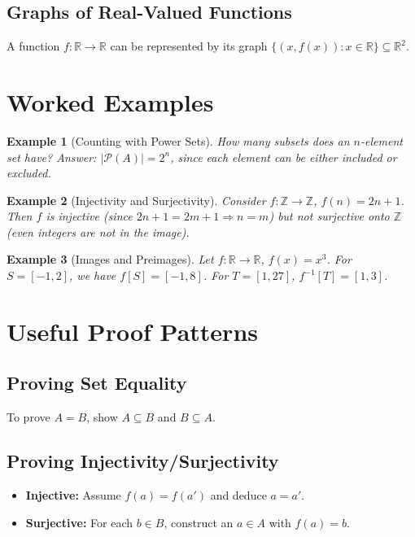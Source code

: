 \documentclass[11pt]{article}
\newtheorem{example}{Example}
\newcommand{\Z}{\mathbb{Z}}
\newcommand{\R}{\mathbb{R}}
\newcommand{\powerset}{\mathcal{P}}
\begin{document}
\subsection{Graphs of Real-Valued Functions}
A function $f\colon \R\to\R$ can be represented by its graph $\{(x,f(x)): x\in\R\}\subseteq\R^2$.

\begin{center}
\end{center}

\section{Worked Examples}
\begin{example}[Counting with Power Sets]
How many subsets does an $n$-element set have? \;\emph{Answer:} $|\powerset(A)|=2^n$, since each element can be either included or excluded.
\end{example}

\begin{example}[Injectivity and Surjectivity]
Consider $f\colon \Z\to\Z$, $f(n)=2n+1$. Then $f$ is injective (since $2n+1=2m+1\Rightarrow n=m$) but not surjective onto $\Z$ (even integers are not in the image).
\end{example}

\begin{example}[Images and Preimages]
Let $f\colon \R\to\R$, $f(x)=x^3$. For $S=[-1,2]$, we have $f[S]=[-1,8]$. For $T=[1,27]$, $f^{-1}[T]=[1,3]$.
\end{example}

\section{Useful Proof Patterns}
\subsection{Proving Set Equality}
To prove $A=B$, show $A\subseteq B$ and $B\subseteq A$.

\subsection{Proving Injectivity/Surjectivity}
\begin{itemize}[leftmargin=*]
  \item \textbf{Injective:} Assume $f(a)=f(a')$ and deduce $a=a'$.
  \item \textbf{Surjective:} For each $b\in B$, construct an $a\in A$ with $f(a)=b$.
\end{itemize}
\end{document}

